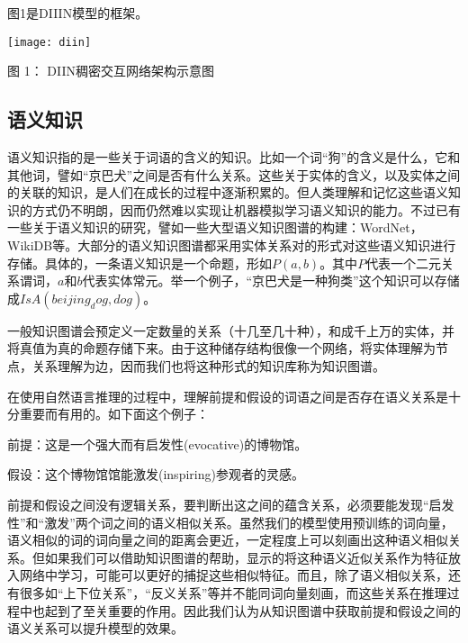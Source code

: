 \documentclass[UTF8,11pt,a4paper,nofonts]{ctexart}
\begin{document}
图1是DIIIN模型的框架。

\begin{table}[htbp!]
\centering
\texttt{[image: diin]}
\caption*{图 1： DIIN稠密交互网络架构示意图}%
\end{table}

\subsection{语义知识}
语义知识指的是一些关于词语的含义的知识。比如一个词“狗”的含义是什么，它和其他词，譬如“京巴犬”之间是否有什么关系。这些关于实体的含义，以及实体之间的关联的知识，是人们在成长的过程中逐渐积累的。但人类理解和记忆这些语义知识的方式仍不明朗，因而仍然难以实现让机器模拟学习语义知识的能力。不过已有一些关于语义知识的研究，譬如一些大型语义知识图谱的构建：WordNet，WikiDB等。大部分的语义知识图谱都采用实体关系对的形式对这些语义知识进行存储。具体的，一条语义知识是一个命题，形如$P(a, b)$。其中$P$代表一个二元关系谓词，$a$和$b$代表实体常元。举一个例子，“京巴犬是一种狗类”这个知识可以存储成$IsA(beijing_dog, dog)$。

一般知识图谱会预定义一定数量的关系（十几至几十种），和成千上万的实体，并将真值为真的命题存储下来。由于这种储存结构很像一个网络，将实体理解为节点，关系理解为边，因而我们也将这种形式的知识库称为知识图谱。


在使用自然语言推理的过程中，理解前提和假设的词语之间是否存在语义关系是十分重要而有用的。如下面这个例子：
    

前提：这是一个强大而有启发性(evocative)的博物馆。

假设：这个博物馆馆能激发(inspiring)参观者的灵感。

前提和假设之间没有逻辑关系，要判断出这之间的蕴含关系，必须要能发现“启发性”和“激发”两个词之间的语义相似关系。虽然我们的模型使用预训练的词向量，语义相似的词的词向量之间的距离会更近，一定程度上可以刻画出这种语义相似关系。但如果我们可以借助知识图谱的帮助，显示的将这种语义近似关系作为特征放入网络中学习，可能可以更好的捕捉这些相似特征。而且，除了语义相似关系，还有很多如“上下位关系”，“反义关系”等并不能同词向量刻画，而这些关系在推理过程中也起到了至关重要的作用。因此我们认为从知识图谱中获取前提和假设之间的语义关系可以提升模型的效果。
\end{document}
